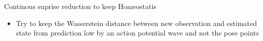 \begin{frame}{Continous suprise reduction to keep Homeostatis}
    \begin{itemize}
        \item Try to keep the Wasserstein distance between new observation and estimated state from prediction low by an action potential wave and not the pose points
    \end{itemize}
\end{frame}